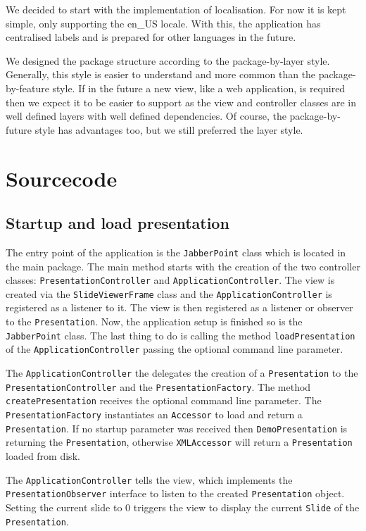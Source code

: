\documentclass[a4paper]{article}
\begin{document}
We decided to start with the implementation of localisation. For now it is kept simple, only supporting the en\_US locale. With this, the application has centralised labels and is prepared for other languages in the future.   

We designed the package structure according to the package-by-layer style. Generally, this style is easier to understand and more common than the package-by-feature style. If in the future a new view, like a web application, is required then we expect it to be easier to support as the view and controller classes are in well defined layers with well defined dependencies. Of course, the package-by-future style has advantages too, but we still preferred the layer style.

\section{Sourcecode}
\subsection{Startup and load presentation}
The entry point of the application is the \texttt{JabberPoint} class which is located in the main package. The main method starts with the creation of the two controller classes: \texttt{PresentationController} and \texttt{ApplicationController}. The view is created via the \texttt{SlideViewerFrame} class and the \texttt{ApplicationController} is registered as a listener to it. The view is then registered as a listener or observer to the \texttt{Presentation}. Now, the application setup is finished so is the \texttt{JabberPoint} class. The last thing to  do is calling the method \texttt{loadPresentation} of the \texttt{ApplicationController} passing the optional command line parameter.

The \texttt{ApplicationController} the delegates the creation of a \texttt{Presentation} to the \texttt{PresentationController} and the \texttt{PresentationFactory}. The method \texttt{createPresentation}  receives the optional command line parameter. The \texttt{PresentationFactory} instantiates an \texttt{Accessor} to load and return a \texttt{Presentation}. If no startup parameter was received then \texttt{DemoPresentation} is returning the \texttt{Presentation}, otherwise \texttt{XMLAccessor} will return a \texttt{Presentation} loaded from disk.

The \texttt{ApplicationController} tells the view, which implements the \texttt{PresentationObserver} interface to listen to the created \texttt{Presentation} object. Setting the current slide to 0 triggers the view to display the current \texttt{Slide} of the \texttt{Presentation}.
\end{document}

